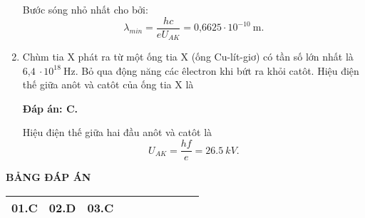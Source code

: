 \begin{enumerate}[label=\bfseries Câu \arabic*:]
{Bước sóng nhỏ nhất cho bởi:
$$
	\lambda_{min} = \dfrac{hc}{eU_{AK}} = \text{0,6625}\cdot 10^{-10}\ \text{m}.
$$
		
	}
	
	\item {}
	
	\cauhoi
	{Chùm tia X phát ra từ một ống tia X (ống Cu-lít-giơ) có tần số lớn nhất là  $\text{6,4}\ \cdot 10^{18}\ \text{Hz}$. Bỏ qua động năng các êlectron khi bứt ra khỏi catôt. Hiệu điện thế giữa anôt và catôt của ống tia X là
	}
	
	\loigiai
	{		\textbf{Đáp án: C.}
		
Hiệu điện thế giữa hai đầu anôt và catôt là
$$
	U_{AK} = \dfrac{hf}{e} = \SI{26,5}{kV}.
$$
		
	}
	
\end{enumerate}

\loigiai
{
	\begin{center}
		\textbf{BẢNG ĐÁP ÁN}
	\end{center}
	\begin{center}
		\begin{tabular}{|m{2.8em}|m{2.8em}|m{2.8em}|m{2.8em}|m{2.8em}|m{2.8em}|m{2.8em}|m{2.8em}|m{2.8em}|m{2.8em}|}
			\hline
			01.C  & 02.D  & 03.C  &  &  &  & & & & \\
			\hline
			
		\end{tabular}
	\end{center}
}

\whiteBGstarEnd
